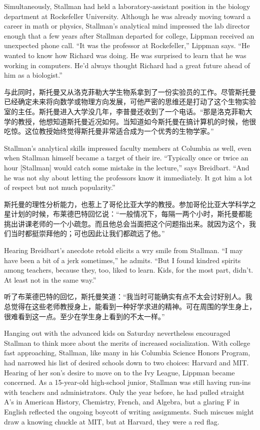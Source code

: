 \ifdefined\eng
Simultaneously, Stallman had held a laboratory-assistant position in the biology department at Rockefeller University. Although he was already moving toward a career in math or physics, Stallman's analytical mind impressed the lab director enough that a few years after Stallman departed for college, Lippman received an unexpected phone call. ``It was the professor at Rockefeller,'' Lippman says. ``He wanted to know how Richard was doing. He was surprised to learn that he was working in computers. He'd always thought Richard had a great future ahead of him as a biologist.''
\fi

\ifdefined\chs
与此同时，斯托曼又从洛克菲勒大学生物系拿到了一份实验员的工作。尽管斯托曼已经确定未来将向数学或物理方向发展，可他严密的思维还是打动了这个生物实验室的主任。斯托曼进入大学没几年，李普曼还收到了一个电话。``那是洛克菲勒大学的教授，他想知道斯托曼近况如何。当知道如今斯托曼在搞计算机的时候，他很吃惊。这位教授始终觉得斯托曼非常适合成为一个优秀的生物学家。''
\fi

\ifdefined\eng
Stallman's analytical skills impressed faculty members at Columbia as well, even when Stallman himself became a target of their ire. ``Typically once or twice an hour [Stallman] would catch some mistake in the lecture,'' says Breidbart. ``And he was not shy about letting the professors know it immediately. It got him a lot of respect but not much popularity.''
\fi

\ifdefined\chs
斯托曼的理性分析能力，也惹上了哥伦比亚大学的教授。参加哥伦比亚大学科学之星计划的时候，布莱德巴特回忆说：``一般情况下，每隔一两个小时，斯托曼都能挑出讲课老师的一个小疏忽。而且他总会当面把这个问题指出来。就因为这个，我们当时都挺崇拜他的；可也因此让我们都疏远了他。''
\fi

\ifdefined\eng
Hearing Breidbart's anecdote retold elicits a wry smile from Stallman. ``I may have been a bit of a jerk sometimes,'' he admits. ``But I found kindred spirits among teachers, because they, too, liked to learn. Kids, for the most part, didn't. At least not in the same way.''
\fi

\ifdefined\chs
听了布莱德巴特的回忆，斯托曼笑道：``我当时可能确实有点不太会讨好别人。我总觉得在这些老师教授身上，能看到一种好学求进的精神。可在周围的学生身上，很难看到这一点。至少在学生身上看到的不太一样。''
\fi

\ifdefined\eng
Hanging out with the advanced kids on Saturday nevertheless encouraged Stallman to think more about the merits of increased socialization. With college fast approaching, Stallman, like many in his Columbia Science Honors Program, had narrowed his list of desired schools down to two choices: Harvard and MIT. Hearing of her son's desire to move on to the Ivy League, Lippman became concerned. As a 15-year-old high-school junior, Stallman was still having run-ins with teachers and administrators. Only the year before, he had pulled straight A's in American History, Chemistry, French, and Algebra, but a glaring F in English reflected the ongoing boycott of writing assignments. Such miscues might draw a knowing chuckle at MIT, but at Harvard, they were a red flag.
\fi

